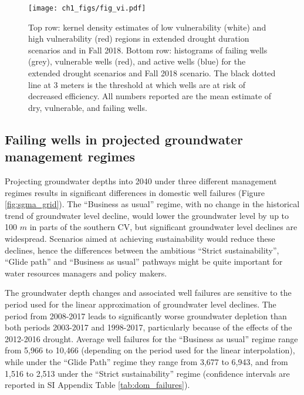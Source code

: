\begin{figure}
	\texttt{[image: ch1\_figs/fig\_vi.pdf]}
	\caption{Top row: kernel density estimates of low vulnerability (white) and high vulnerability (red) regions in extended drought duration scenarios and in Fall 2018. Bottom row: histograms of failing wells (grey), vulnerable wells (red), and active wells (blue) for the extended drought scenarios and Fall 2018 scenario. The black dotted line at 3 meters is the threshold at which wells are at risk of decreased efficiency. All numbers reported are the mean estimate of dry, vulnerable, and failing wells.}
	\label{fig:vi}
\end{figure}



\subsection{Failing wells in projected groundwater management regimes}

Projecting groundwater depths into 2040 under three different management regimes results in significant differences in domestic well failures (Figure \ref{fig:sgma_grid}). The ``Business as usual'' regime, with no change in the historical trend of groundwater level decline, would lower the groundwater level by up to 100 $m$ in parts of the southern CV, but significant groundwater level declines are widespread. Scenarios aimed at achieving sustainability would reduce these declines, hence the differences between the ambitious ``Strict sustainability'', ``Glide path'' and ``Business as usual'' pathways might be quite important for water resources managers and policy makers.

The groundwater depth changes and associated well failures are sensitive to the period used for the linear approximation of groundwater level declines. The period from 2008-2017 leads to significantly worse groundwater depletion than both periods 2003-2017 and 1998-2017, particularly because of the effects of the 2012-2016 drought. Average well failures for the ``Business as usual'' regime range from 5,966 to 10,466 (depending on the period used for the linear interpolation), while under the ``Glide Path'' regime they range from 3,677 to 6,943, and from 1,516 to 2,513 under the ``Strict sustainability'' regime (confidence intervals are reported in SI Appendix Table \ref{tab:dom_failures}).  

